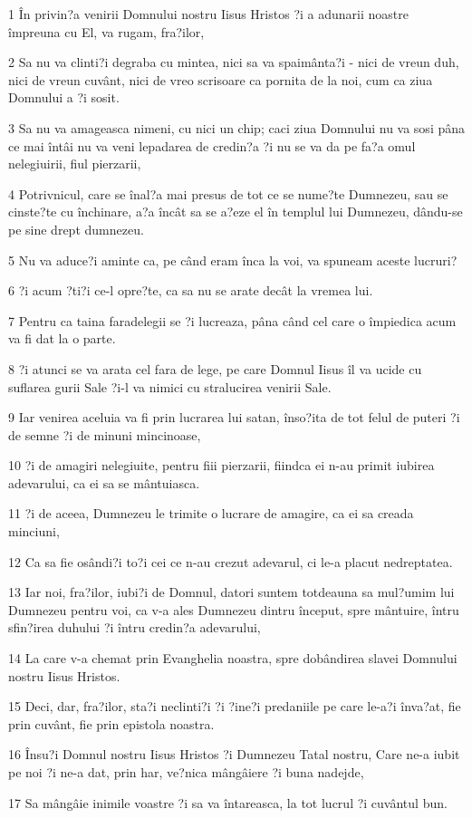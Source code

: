 \par 1 În privin?a venirii Domnului nostru Iisus Hristos ?i a adunarii noastre împreuna cu El, va rugam, fra?ilor,
\par 2 Sa nu va clinti?i degraba cu mintea, nici sa va spaimânta?i - nici de vreun duh, nici de vreun cuvânt, nici de vreo scrisoare ca pornita de la noi, cum ca ziua Domnului a ?i sosit.
\par 3 Sa nu va amageasca nimeni, cu nici un chip; caci ziua Domnului nu va sosi pâna ce mai întâi nu va veni lepadarea de credin?a ?i nu se va da pe fa?a omul nelegiuirii, fiul pierzarii,
\par 4 Potrivnicul, care se înal?a mai presus de tot ce se nume?te Dumnezeu, sau se cinste?te cu închinare, a?a încât sa se a?eze el în templul lui Dumnezeu, dându-se pe sine drept dumnezeu.
\par 5 Nu va aduce?i aminte ca, pe când eram înca la voi, va spuneam aceste lucruri?
\par 6 ?i acum ?ti?i ce-l opre?te, ca sa nu se arate decât la vremea lui.
\par 7 Pentru ca taina faradelegii se ?i lucreaza, pâna când cel care o împiedica acum va fi dat la o parte.
\par 8 ?i atunci se va arata cel fara de lege, pe care Domnul Iisus îl va ucide cu suflarea gurii Sale ?i-l va nimici cu stralucirea venirii Sale.
\par 9 Iar venirea aceluia va fi prin lucrarea lui satan, înso?ita de tot felul de puteri ?i de semne ?i de minuni mincinoase,
\par 10 ?i de amagiri nelegiuite, pentru fiii pierzarii, fiindca ei n-au primit iubirea adevarului, ca ei sa se mântuiasca.
\par 11 ?i de aceea, Dumnezeu le trimite o lucrare de amagire, ca ei sa creada minciuni,
\par 12 Ca sa fie osândi?i to?i cei ce n-au crezut adevarul, ci le-a placut nedreptatea.
\par 13 Iar noi, fra?ilor, iubi?i de Domnul, datori suntem totdeauna sa mul?umim lui Dumnezeu pentru voi, ca v-a ales Dumnezeu dintru început, spre mântuire, întru sfin?irea duhului ?i întru credin?a adevarului,
\par 14 La care v-a chemat prin Evanghelia noastra, spre dobândirea slavei Domnului nostru Iisus Hristos.
\par 15 Deci, dar, fra?ilor, sta?i neclinti?i ?i ?ine?i predaniile pe care le-a?i înva?at, fie prin cuvânt, fie prin epistola noastra.
\par 16 Însu?i Domnul nostru Iisus Hristos ?i Dumnezeu Tatal nostru, Care ne-a iubit pe noi ?i ne-a dat, prin har, ve?nica mângâiere ?i buna nadejde,
\par 17 Sa mângâie inimile voastre ?i sa va întareasca, la tot lucrul ?i cuvântul bun.

